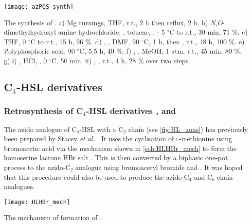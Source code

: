 \begin{scheme}[H]
	\begin{center}
		\texttt{[image: azPQS\_synth]}
		\caption{The synthesis of .
		a) Mg turnings, THF, r.t., 2 h then reflux, 2 h.
		b) \textit{N},\textit{O}-dimethylhydroxyl amine hydrochloride, , toluene, , - 5 $^{\circ}$C to r.t., 30 min, 71 \%.
		c) THF, 0 $^{\circ}$C to r.t., 15 h, 96 \%.
		d) , , DMF, 90 $^{\circ}$C, 1 h, then , r.t., 18 h, 100 \%.
		e) Polyphosphoric acid, 90 $^{\circ}$C, 5.5 h, 40 \%.
		f) , , MeOH, 1 atm, r.t., 45 min, 80 \%.
		g) i) , HCl, , 0 $^{\circ}$C, 50 min. ii) , , r.t., 4 h, 28 \% over two steps.
		\label{sch:azPQS_synth}}
	\end{center}
\end{scheme}

\subsection{C$_4$-HSL derivatives}

\subsubsection{Retrosynthesis of C$_4$-HSL derivatives ,  and }

The azido analogue of C$_4$-HSL with a C$_2$ chain  (see \ref{fig:HL_anas}) has previously been prepared by Stacey \textit{et al.} \cite{Stacy2013}. It uses the cyclisation of \textsc{l}-methionine  using bromoacetic acid via the mechanism shown in \ref{sch:HLHBr_mech} to form the homoserine lactone HBr salt . This is then converted by a biphasic one-pot process to the azido-C$_2$ analogue  using bromoacetyl bromide  and . It was hoped that this procedure could also be used to produce the azido-C$_4$ and C$_6$ chain analogues.

\begin{scheme}[H]
	\begin{center}
		\texttt{[image: HLHBr\_mech]}
		\caption{The mechanism of formation of . \label{sch:HLHBr_mech}}
	\end{center}
\end{scheme}

